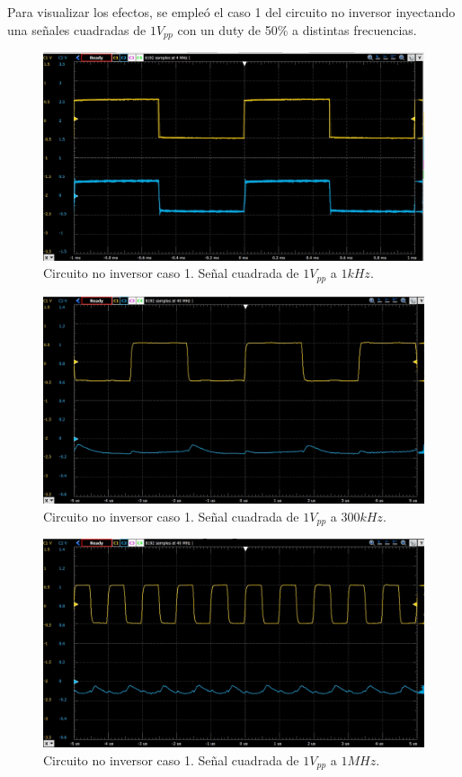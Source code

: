 Para visualizar los efectos, se empleó el caso 1 del circuito no inversor inyectando una señales cuadradas de $1V_{pp}$ con un duty de 50\% a distintas frecuencias.


\begin{figure}[H]
	\centering
	\includegraphics[scale=0.25]{./Imagenes/Sqr1k.jpg}
	\caption{Circuito no inversor caso 1. Señal cuadrada de $1V_{pp}$ a $1kHz$.}
	\label{fig:1kHz}
\end{figure}


\begin{figure}[H]
	\centering
	\includegraphics[scale=0.25]{./Imagenes/Sqr300k.jpg}
	\caption{Circuito no inversor caso 1. Señal cuadrada de $1V_{pp}$ a $300kHz$.}
	\label{fig:300kHz}
\end{figure}


\begin{figure}[H]
	\centering
	\includegraphics[scale=0.25]{./Imagenes/Sqr1MHz.jpg}
	\caption{Circuito no inversor caso 1. Señal cuadrada de $1V_{pp}$ a $1MHz$.}
	\label{fig:1MHz}
\end{figure}

